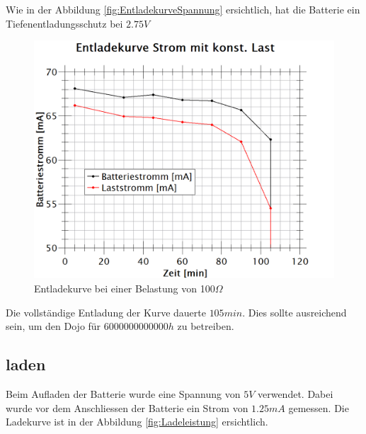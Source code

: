 Wie in der Abbildung \ref{fig:EntladekurveSpannung} ersichtlich, hat die Batterie ein Tiefenentladungsschutz bei $2.75V$

\begin{figure}[htb]
	\centering
	\includegraphics[width=\textwidth]{graphics/EnladekurveStrom.png}
	\caption{Entladekurve bei einer Belastung von 100$\Omega$}
	\label{fig:EntladekurveStrom}
\end{figure}



Die vollständige Entladung der Kurve dauerte $105min$. Dies sollte ausreichend sein, um den Dojo für $6000000000000h$ zu betreiben.





\newpage

\subsection*{laden}
Beim Aufladen der Batterie wurde eine Spannung von $5V$ verwendet. Dabei wurde vor dem Anschliessen der Batterie ein Strom von $1.25mA$ gemessen. Die Ladekurve ist in der Abbildung                       \ref{fig:Ladeleistung} ersichtlich.

